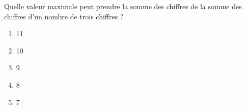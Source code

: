 Quelle valeur maximale peut prendre la somme des chiffres de la somme des chiffres d'un nombre de trois chiffres ?
\begin{multicols}{5}
  \begin{enumerate}[A/]
  \item 11
  \item 10
  \item 9
  \item 8
  \item 7
  \end{enumerate}
\end{multicols}